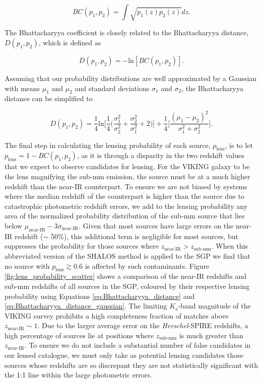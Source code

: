 \begin{equation}
    BC(p_1, p_2) = \int \sqrt{p_1(z) p_2(z)} dz.
\end{equation}

The Bhattacharyya coefficient is closely related to the Bhattacharyya distance, $D(p_1,p_2)$, which is defined as

\begin{equation}
    D(p_1, p_2) = -\textrm{ln}[BC(p_1, p_2)].
\label{eq:Bhattacharyya_distance}
\end{equation}

Assuming that our probability distributions are well approximated by a Gaussian with means $\mu_1$ and $\mu_2$ and standard deviations $\sigma_1$ and $\sigma_2$, the Bhattacharyya distance can be simplified to

\begin{equation}
    D(p_1, p_2) = \frac{1}{4}\textrm{ln}\Bigg[\frac{1}{4}\Bigg(\frac{\sigma_1^2}{\sigma_2^2}+\frac{\sigma_2^2}{\sigma_1^2}+2\Bigg)\Bigg] + \frac{1}{4}\Bigg[\frac{(\mu_1 - \mu_2)^2}{\sigma_1^2 + \sigma_2^2}\Bigg].
\label{eq:Bhattacharyya_distance_gaussian}
\end{equation}

The final step in calculating the lensing probability of each source, $p_{\textrm{lens}}$, is to let $p_{\textrm{lens}} = 1 - BC(p_1, p_2)$, as it is through a disparity in the two redshift values that we expect to observe candidates for lensing. For the VIKING galaxy to be the lens magnifying the sub-mm emission, the source must be at a much higher redshift than the near-IR counterpart. To ensure we are not biased by systems where the median redshift of the counterpart is higher than the source due to catastrophic photometric redshift errors, we add to the lensing probability any area of the normalized probability distribution of the sub-mm source that lies below $\mu_\textrm{near-IR} - 3\sigma_\textrm{near-IR}$. Given that most sources have large errors on the near-IR redshift ($\sim$ 50\%), this additional term is negligible for most sources, but suppresses the probability for those sources where $z_\textrm{near-IR} > z_\textrm{sub-mm}$. When this abbreviated version of the SHALOS method is applied to the SGP we find that no source with $p_{\textrm{lens}} \gtrsim 0.6$ is affected by such contaminants. Figure \ref{fig:lens_probability_scatter} shows a comparison of the near-IR redshifts and sub-mm redshifts of all sources in the SGP, coloured by their respective lensing probability using Equations \ref{eq:Bhattacharyya_distance} and \ref{eq:Bhattacharyya_distance_gaussian}. The limiting $K_s$-band magnitude of the VIKING survey prohibits a high completeness fraction of matches above $z_\textrm{near-IR} \sim 1$. Due to the larger average error on the \textit{Herschel}-SPIRE redshifts, a high percentage of sources lie at positions where $z_\textrm{sub-mm}$ is much greater than $z_\textrm{near-IR}$. To ensure we do not include a substantial number of false candidates in our lensed catalogue, we must only take as potential lensing candidates those sources whose redshifts are so discrepant they are not statistically significant with the 1:1 line within the large photometric errors.

